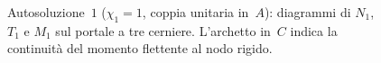 \begin{figure}[htbp]
{\begin{tikzpicture}
				\end{tikzpicture}
			}%
			\caption{Autosoluzione~$1$ ($\chi_1 = 1$, coppia unitaria in~$A$):
				diagrammi di $N_1$, $T_1$ e $M_1$ sul portale a tre cerniere.
				L'archetto in~$C$ indica la continuità del momento flettente
				al nodo rigido.}
			\label{fig:portale_autosoluzione1}
		\end{figure}

